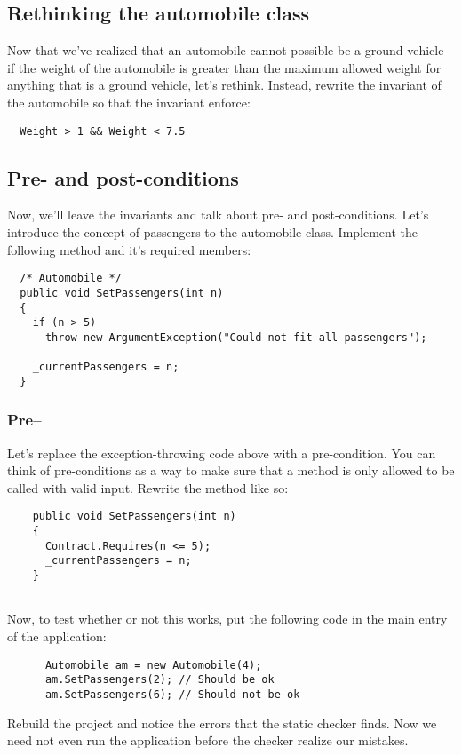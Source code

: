 \documentclass{article}
\begin{document}
    \subsection{Rethinking the automobile class}
      Now that we've realized that an automobile cannot possible be a ground vehicle if the weight of the automobile is greater than the maximum allowed weight for anything that is a ground vehicle, let's rethink. Instead, rewrite the invariant of the automobile so that the invariant enforce:

      \begin{lstlisting}
  Weight > 1 && Weight < 7.5
      \end{lstlisting}


  \subsection{Pre- and post-conditions}
    Now, we'll leave the invariants and talk about pre- and post-conditions. Let's introduce the concept of passengers to the automobile class. Implement the following method and it's required members:

    \begin{lstlisting}
  /* Automobile */
  public void SetPassengers(int n)
  {
    if (n > 5)
      throw new ArgumentException("Could not fit all passengers");

    _currentPassengers = n;
  }
    \end{lstlisting}

    \subsubsection{Pre--}
      Let's replace the exception-throwing code above with a pre-condition. You can think of pre-conditions as a way to make sure that a method is only allowed to be called with valid input. Rewrite the method like so:

      \begin{lstlisting}
    public void SetPassengers(int n)
    {
      Contract.Requires(n <= 5);
      _currentPassengers = n;
    }
    
      \end{lstlisting}
      Now, to test whether or not this works, put the following code in the main entry of the application:
      \begin{lstlisting}
      Automobile am = new Automobile(4);
      am.SetPassengers(2); // Should be ok
      am.SetPassengers(6); // Should not be ok
      \end{lstlisting}
      Rebuild the project and notice the errors that the static checker finds. Now we need not even run the application before the checker realize our mistakes.
\end{document}
